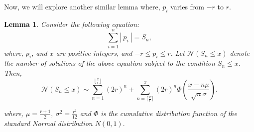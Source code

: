 \documentclass[11pt]{amsart}
\numberwithin{equation}{section}
\newtheorem{lemma}[theorem]{Lemma}
\numberwithin{equation}{section}
\begin{document}
	
	 Now, we will explore another similar lemma where, $p_{i}$ varies from $-r$ to $r$.
	 \begin{lemma}\label{4.3}
 Consider the following equation: 	
	 	\begin{equation}
	 		\sum_{i=1}^{n} |~p_{i}~|=S_{n}, 
	 	\end{equation}
	 	where, $p_{i}$, and $x$ are positive integers, and  \( -r \leq p_i \leq r \). Let $\mathcal{N}(S_{n}\leq x) $ denote the number of solutions of the above equation subject to the condition $S_n \leq x$.  Then,  \[ \mathcal{N}(S_{n}\leq x)\sim \sum_{n=1}^{\lfloor \frac{x}{r}\rfloor}(2r)^{n}+{\sum_{n=\lceil \frac{x}{r}\rceil}^{x}(2r)^{n}\Phi\left(\frac{x-n\mu}{\sqrt{n}\sigma}\right)} .\]
	 	
	 	where, ${\mu=\frac{r+1}{2}}, ~\sigma^{2}=\frac{r^2}{12}$ and $\Phi$ is the cumulative distribution function of the standard Normal distribution $N(0,1).$
	 \end{lemma}
\end{document}
